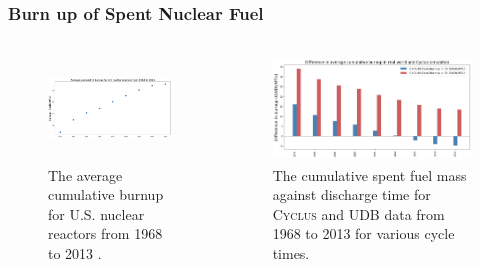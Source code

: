 \begin{frame}
    \frametitle{Burn up of Spent Nuclear Fuel}
    \begin{columns}
        \column[t]{5cm}
        \begin{figure}[htbp!]
        \begin{center}
        \includegraphics[height=2.8cm]{../figures/burn_up_real}
        \end{center}
        \caption{The average cumulative burnup for U.S. nuclear reactors
        from 1968 to 2013 \cite{eia_spent_2015}.}
        \end{figure}
        \column[t]{5cm}
        \begin{figure}[htbp!]
            \begin{center}
            \includegraphics[height=2.8cm]{../figures/burn_up_difference}
            \end{center}
                \caption{The cumulative spent fuel mass against discharge time
                for \textsc{Cyclus} and UDB data from 1968 to 2013 for various cycle
                times.}
            \end{figure}
    \end{columns}
\end{frame}

